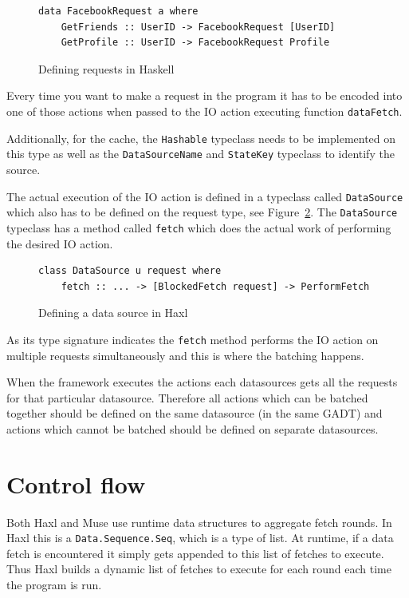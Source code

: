 \begin{figure}
\begin{verbatim}
data FacebookRequest a where
    GetFriends :: UserID -> FacebookRequest [UserID]
    GetProfile :: UserID -> FacebookRequest Profile
\end{verbatim}
\caption{Defining requests in Haskell}
\label{fig:defining-requests-in-haxl}
\end{figure}


Every time you want to make a request in the program it has to be encoded into one of those actions when passed to the IO action executing function \texttt{dataFetch}.

Additionally, for the cache, the \texttt{Hashable} typeclass needs to be implemented on this type as well as the \texttt{DataSourceName} and \texttt{StateKey} typeclass to identify the source.

The actual execution of the IO action is defined in a typeclass called \texttt{DataSource} which also has to be defined on the request type, see Figure~\ref{fig:defining-datsource-in-haxl}.
The \texttt{DataSource} typeclass has a method called \texttt{fetch} which does the actual work of performing the desired IO action.

\begin{figure}
\begin{verbatim}
class DataSource u request where
    fetch :: ... -> [BlockedFetch request] -> PerformFetch
\end{verbatim}
\caption{Defining a data source in Haxl}
\label{fig:defining-datsource-in-haxl}
\end{figure}

As its type signature indicates the \texttt{fetch} method performs the IO action on multiple requests simultaneously and this is where the batching happens.

When the framework executes the actions each datasources gets all the requests for that particular datasource. Therefore all actions which can be batched together should be defined on the same datasource (in the same GADT) and actions which cannot be batched should be defined on separate datasources.

\section{Control flow}

Both Haxl and Muse use runtime data structures to aggregate fetch rounds.
In Haxl this is a \texttt{Data.Sequence.Seq}, which is a type of list.
At runtime, if a data fetch is encountered it simply gets appended to this list of fetches to execute.
Thus Haxl builds a dynamic list of fetches to execute for each round each time the program is run.

